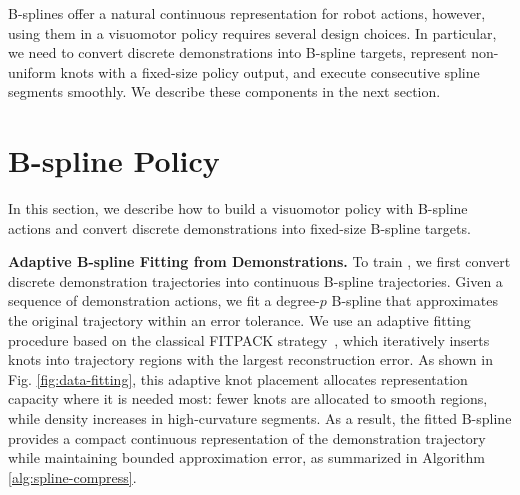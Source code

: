 



B-splines offer a natural continuous representation for robot actions, however, using them in a visuomotor policy requires several design choices. In particular, we need to convert discrete demonstrations into B-spline targets, represent non-uniform knots with a fixed-size policy output, and execute consecutive spline segments smoothly. We describe these components in the next section.


\section{B-spline Policy}
\label{sec:model-train}

In this section, we describe how to build a visuomotor policy with B-spline actions and convert discrete demonstrations into fixed-size B-spline targets.

\noindent\textbf{Adaptive B-spline Fitting from Demonstrations.}
% 
% 
% 
% 
% 
% 
% 
To train \our, we first convert discrete demonstration trajectories into continuous B-spline trajectories.
%
Given a sequence of demonstration actions, we fit a degree-$p$ B-spline that approximates the original trajectory within an error tolerance. We use an adaptive fitting procedure based on the classical FITPACK strategy~\cite{fitting-bspline,dierckx1995curve,dierckx1982algorithms}, which iteratively inserts knots into trajectory regions with the largest reconstruction error.
\newline
As shown in Fig. \ref{fig:data-fitting}, this adaptive knot placement allocates representation capacity where it is needed most: fewer knots are allocated to smooth regions, while density increases in high-curvature segments. As a result, the fitted B-spline provides a compact continuous representation of the demonstration trajectory while maintaining bounded approximation error, as summarized in Algorithm \ref{alg:spline-compress}.

